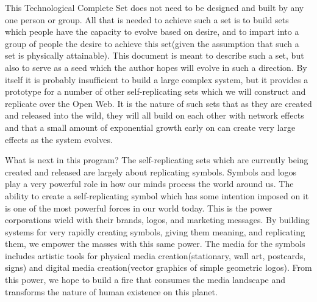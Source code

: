 This Technological Complete Set does not need to be designed and built
by any one person or group. All that is needed to achieve such a set is
to build sets which people have the capacity to evolve based on desire,
and to impart into a group of people the desire to achieve this
set(given the assumption that such a set is physically attainable). This
document is meant to describe such a set, but also to serve as a seed
which the author hopes will evolve in such a direction. By itself it is
probably insufficient to build a large complex system, but it provides a
prototype for a number of other self-replicating sets which we will
construct and replicate over the Open Web. It is the nature of such sets
that as they are created and released into the wild, they will all build
on each other with network effects and that a small amount of
exponential growth early on can create very large effects as the system
evolves.

What is next in this program? The self-replicating sets which are
currently being created and released are largely about replicating
symbols. Symbols and logos play a very powerful role in how our minds
process the world around us. The ability to create a self-replicating
symbol which has some intention imposed on it is one of the most
powerful forces in our world today. This is the power corporations wield
with their brands, logos, and marketing messages. By building systems
for very rapidly creating symbols, giving them meaning, and replicating
them, we empower the masses with this same power. The media for the
symbols includes artistic tools for physical media creation(stationary,
wall art, postcards, signs) and digital media creation(vector graphics
of simple geometric logos). From this power, we hope to build a fire
that consumes the media landscape and transforms the nature of human
existence on this planet.
